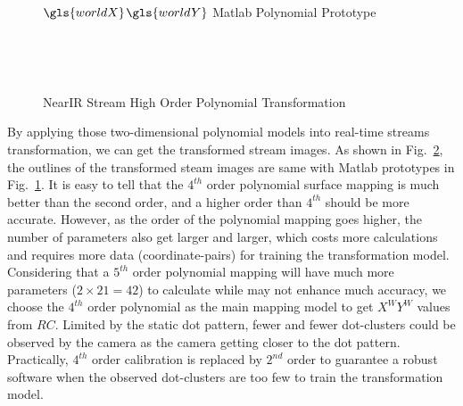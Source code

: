 %
\begin{figure}[!t]
\hspace*{-0.3cm}
\centering
{}
{}

{}
%
\caption{\(\gls{worldX}\)\(\gls{worldY}\) Matlab Polynomial Prototype}
\label{MatlabPrototpyeOfHighOrder}
\end{figure}%
%
\\\indent
\begin{figure}[!t]
\centering
\hspace*{-0.3cm}
%
%
\\%
\hspace*{-0.3cm}
%
%
\caption{\gls{NearIR} Stream High Order Polynomial Transformation}
\label{HighOrderNearIRRectification}
\end{figure}%
%
By applying those two-dimensional polynomial models into real-time streams transformation, we can get the transformed stream images. As shown in Fig.~\ref{HighOrderNearIRRectification}, the outlines of the transformed steam images are same with Matlab prototypes in Fig.~\ref{MatlabPrototpyeOfHighOrder}. It is easy to tell that the \(4^{th}\) order polynomial surface mapping is much better than the second order, and a higher order than \(4^{th}\) should be more accurate. However, as the order of the polynomial mapping goes higher, the number of parameters also get larger and larger, which costs more calculations and requires more data (coordinate-pairs) for training the transformation model. Considering that a \(5^{th}\) order polynomial mapping will have much more  parameters ($2\times21=42$) to calculate while may not enhance much accuracy, we choose the \(4^{th}\) order polynomial as the main mapping model to get \(X^WY^W\) values from \(RC\). Limited by the static dot pattern, fewer and fewer dot-clusters could be observed by the camera as the camera getting closer to the dot pattern. Practically, \(4^{th}\) order calibration is replaced by \(2^{nd}\) order to guarantee a robust software when the observed dot-clusters are too few to train the transformation model.
